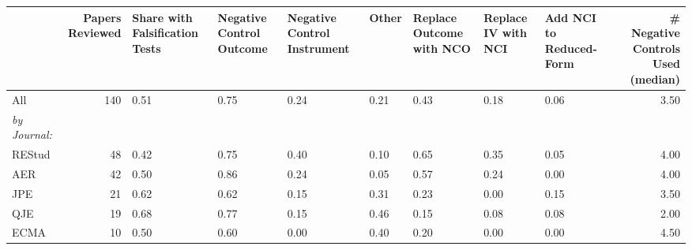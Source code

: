\begin{table}[ht]
\centering
\begin{tabular}{lrlllllllr}
  \hline
 & Papers Reviewed & Share with Falsification Tests & Negative Control Outcome & Negative Control Instrument & Other & Replace Outcome with NCO & Replace IV with NCI & Add NCI to Reduced-Form & \# Negative Controls Used (median) \\ 
  \hline
All & 140 & 0.51 & 0.75 & 0.24 & 0.21 & 0.43 & 0.18 & 0.06 & 3.50 \\ 
   \textit{by Journal:}\\REStud &  48 & 0.42 & 0.75 & 0.40 & 0.10 & 0.65 & 0.35 & 0.05 & 4.00 \\ 
  AER &  42 & 0.50 & 0.86 & 0.24 & 0.05 & 0.57 & 0.24 & 0.00 & 4.00 \\ 
  JPE &  21 & 0.62 & 0.62 & 0.15 & 0.31 & 0.23 & 0.00 & 0.15 & 3.50 \\ 
  QJE &  19 & 0.68 & 0.77 & 0.15 & 0.46 & 0.15 & 0.08 & 0.08 & 2.00 \\ 
  ECMA &  10 & 0.50 & 0.60 & 0.00 & 0.40 & 0.20 & 0.00 & 0.00 & 4.50 \\ 
   \hline
\end{tabular}
\end{table}
